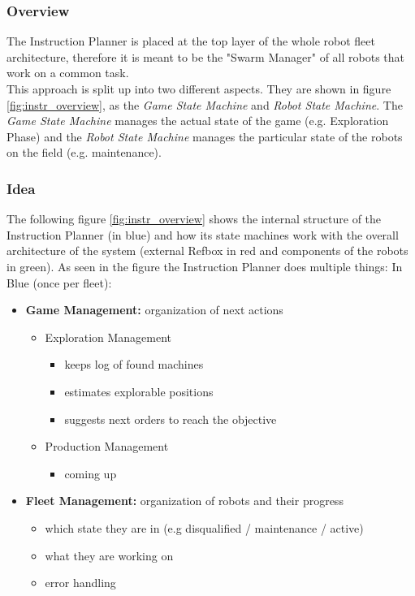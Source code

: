

\subsubsection{Overview}
The Instruction Planner is placed at the top layer of the whole robot fleet architecture,
therefore it is meant to be the "Swarm Manager" of all robots that work on a common task. \\
This approach is split up into two different aspects. They are shown in figure \ref{fig:instr_overview}, as the \textit{Game State Machine} and \textit{Robot State Machine}.
The \textit{Game State Machine} manages the actual state of the game (e.g. Exploration Phase) and the \textit{Robot State Machine} manages the particular state of the robots on the field (e.g. maintenance).

\subsubsection{Idea}

The following figure \ref{fig:instr_overview} shows the internal structure of the
Instruction Planner (in blue)  and how its state machines work with the overall architecture of the system (external Refbox in red and components of the robots in green).
As seen in the figure the Instruction Planner does multiple things: \newpage
In Blue (once per fleet):\\
\begin{itemize}
    \item \textbf{Game Management:}  organization of next actions
    \begin{itemize}
        \item Exploration Management
            \begin{itemize}
                \item keeps log of found machines
                \item estimates explorable positions
                \item suggests next orders to reach the objective
            \end{itemize}
        \item Production Management
        \begin{itemize}
            \item coming up
        \end{itemize}
    \end{itemize}
    \item \textbf{Fleet Management:} organization of robots and their progress
    \begin{itemize}
        \item which state they are in (e.g disqualified / maintenance / active)
        \item what they are working on
        \item error handling
    \end{itemize}
\end{itemize}


